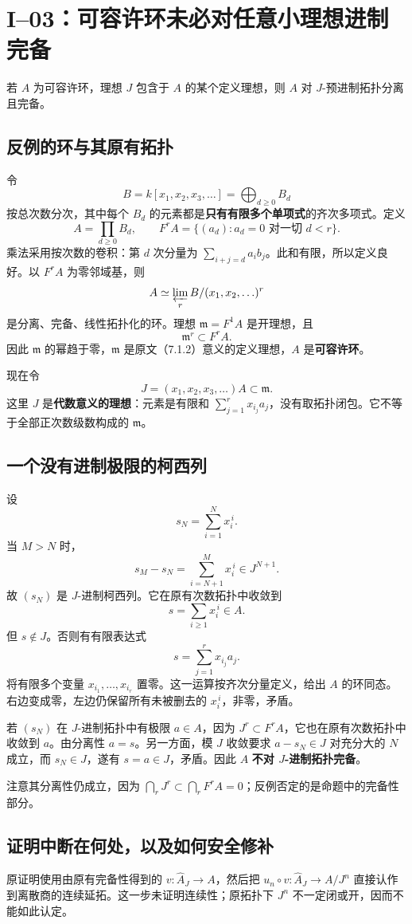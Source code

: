 \section{I--03：可容许环未必对任意小理想进制完备}
若 $A$ 为可容许环，理想 $J$ 包含于 $A$ 的某个定义理想，则 $A$ 对 $J$-预进制拓扑分离且完备。
\subsection*{反例的环与其原有拓扑}
令
\[
B=k[x_1,x_2,x_3,\ldots]=\bigoplus_{d\ge0}B_d
\]
按总次数分次，其中每个 $B_d$ 的元素都是\textbf{只有有限多个单项式}的齐次多项式。定义
\[
A=\prod_{d\ge0}B_d,
\qquad F^rA=\{(a_d):a_d=0\text{ 对一切 }d<r\}.
\]
乘法采用按次数的卷积：第 $d$ 次分量为 $\sum_{i+j=d}a_i b_j$。此和有限，所以定义良好。以 $F^rA$ 为零邻域基，则
\[
A\simeq\varprojlim_r B/(x_1,x_2,\ldots)^r
\]
是分离、完备、线性拓扑化的环。理想 $\mathfrak m=F^1A$ 是开理想，且
\[
\mathfrak m^r\subset F^rA.
\]
因此 $\mathfrak m$ 的幂趋于零，$\mathfrak m$ 是原文（7.1.2）意义的定义理想，$A$ 是\textbf{可容许环}。

现在令
\[
J=(x_1,x_2,x_3,\ldots)A\subset\mathfrak m.
\]
这里 $J$ 是\textbf{代数意义的理想}：元素是有限和 $\sum_{j=1}^{r}x_{i_j}a_j$，没有取拓扑闭包。它不等于全部正次数级数构成的 $\mathfrak m$。
\subsection*{一个没有进制极限的柯西列}
设
\[
s_N=\sum_{i=1}^{N}x_i^{\,i}.
\]
当 $M>N$ 时，
\[
s_M-s_N=\sum_{i=N+1}^{M}x_i^{\,i}\in J^{N+1}.
\]
故 $(s_N)$ 是 $J$-进制柯西列。它在原有次数拓扑中收敛到
\[
s=\sum_{i\ge1}x_i^{\,i}\in A.
\]
但 $s\notin J$。否则有有限表达式
\[
s=\sum_{j=1}^{r}x_{i_j}a_j.
\]
将有限多个变量 $x_{i_1},\ldots,x_{i_r}$ 置零。这一运算按齐次分量定义，给出 $A$ 的环同态。右边变成零，左边仍保留所有未被删去的 $x_i^{\,i}$，非零，矛盾。

若 $(s_N)$ 在 $J$-进制拓扑中有极限 $a\in A$，因为 $J^r\subset F^rA$，它也在原有次数拓扑中收敛到 $a$。由分离性 $a=s$。另一方面，模 $J$ 收敛要求 $a-s_N\in J$ 对充分大的 $N$ 成立，而 $s_N\in J$，遂有 $s=a\in J$，矛盾。因此 $A$ \textbf{不对 $J$-进制拓扑完备}。

注意其分离性仍成立，因为 $\bigcap_rJ^r\subset\bigcap_rF^rA=0$；反例否定的是命题中的完备性部分。
\subsection*{证明中断在何处，以及如何安全修补}
原证明使用由原有完备性得到的 $v:\widehat A_J\to A$，然后把 $u_n\circ v:\widehat A_J\to A/J^n$ 直接认作到离散商的连续延拓。这一步未证明连续性；原拓扑下 $J^n$ 不一定闭或开，因而不能如此认定。

